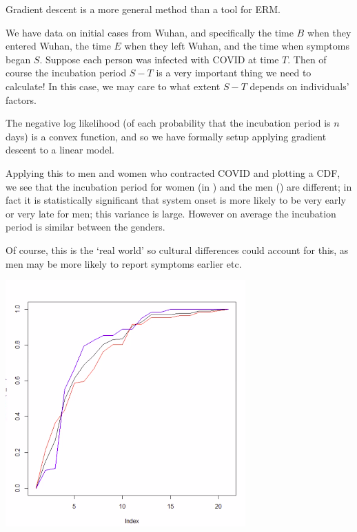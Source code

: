 \documentclass[11pt]{scrartcl}
\begin{document}
\begin{example}
Gradient descent is a more general method than a tool for ERM.

We have data on initial cases from Wuhan, and specifically the time $B$ when they entered Wuhan, the time $E$ when they left Wuhan, and the time when symptoms began $S$. Suppose each person was infected with COVID at time $T$. Then of course the incubation period $S-T$ is a very important thing we need to calculate! In this case, we may care to what extent $S-T$ depends on individuals' factors.

The negative log likelihood (of each probability that the incubation period is $n$ days) is a convex function, and so we have formally setup applying gradient descent to a linear model.

Applying this to men and women who contracted COVID and plotting a CDF, we see that the incubation period for women (in \color{blue}{blue}\color{black}) and the men (\color{red}{red}\color{black}) are different; in fact it is statistically significant that system onset is more likely to be very early or very late for men; this variance is large. However on average the incubation period is similar between the genders.

Of course, this is the `real world' so cultural differences could account for this, as men may be more likely to report symptoms earlier etc.
\begin{center}
\includegraphics[scale=0.5]{men wamen.png}
    \label{fig:men wamen covid}
\end{center}

\end{example}
\end{document}
